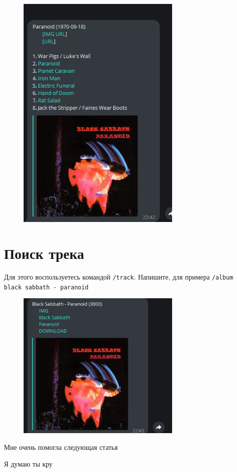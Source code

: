 \begin{figure}[H]
  \centering
  \includegraphics[width=8cm]{inc/img/album.png}
\end{figure}

\section{Поиск трека}

Для этого воспользуетесь командой \texttt{/track}.  Напишите, для
примера \texttt{/album black sabbath - paranoid}

\begin{figure}[H]
  \centering
  \includegraphics[width=8cm]{inc/img/track.png}
\end{figure}

Мне очень помогла следующая статья \cite{tg-bots}

Я думаю ты кру